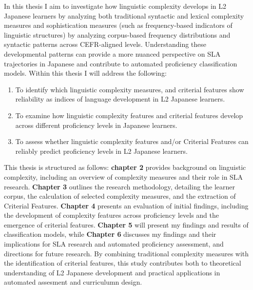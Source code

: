 In this thesis I aim to  investigate how linguistic complexity develops in L2 Japanese learners by analyzing
both traditional syntactic and lexical complexity measures and sophistication measures (such as frequency-based
indicators of linguistic structures) by analyzing corpus-based frequency distributions and syntactic patterns across CEFR-aligned levels. Understanding these developmental patterns can provide a more nuanced
perspective on SLA trajectories in Japanese and contribute to automated proficiency classification models. Within
this thesis I will address the following:
\begin{enumerate}
    \item To identify which linguistic complexity measures, and criterial features show reliability as indices of
    language development in
    L2 Japanese learners.
    \item To examine how linguistic complexity features and criterial features develop across different proficiency
    levels in Japanese
    learners.%
    \item To assess whether linguistic complexity features and/or Criterial Features can reliably predict proficiency
    levels in L2 Japanese
    learners.
\end{enumerate}

This thesis is structured as follows: \textbf{chapter 2} provides background on linguistic complexity, including an
overview of complexity measures and their role in SLA research.
\textbf{Chapter 3} outlines the research methodology, detailing the learner corpus, the calculation of selected
complexity measures, and the extraction of Criterial Features.
 \textbf{Chapter 4} presents an evaluation of initial findings, including the development of complexity features across proficiency levels and the emergence of criterial features.
\textbf{Chapter 5 }will present my findings and results of classification models, while \textbf{Chapter 6}
discusses my findings and their implications for SLA research and automated proficiency assessment, and directions for
future research. By combining traditional complexity measures with the identification of criterial features, this
study contributes both to theoretical understanding of L2 Japanese development and practical applications in
automated assesment and curriculumn design. %